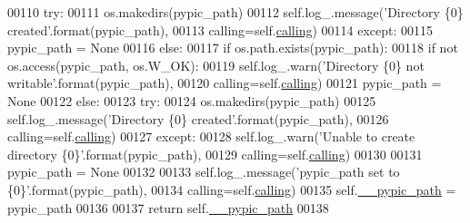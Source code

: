 \begin{DoxyCode}
00110                     \textcolor{keywordflow}{try}:
00111                         os.makedirs(pypic\_path)
00112                         self.log\_.message(\textcolor{stringliteral}{'Directory \{0\} created'}.format(pypic\_path),
00113                                           calling=self.\hyperlink{classpyneb_1_1utils_1_1_config_1_1___config_abf04542e5670abea107260ca7a6baf6d}{calling})
00114                     \textcolor{keywordflow}{except}:
00115                         pypic\_path = \textcolor{keywordtype}{None}
00116         \textcolor{keywordflow}{else}:
00117             \textcolor{keywordflow}{if} os.path.exists(pypic\_path):
00118                 \textcolor{keywordflow}{if} \textcolor{keywordflow}{not} os.access(pypic\_path, os.W\_OK):
00119                     self.log\_.warn(\textcolor{stringliteral}{'Directory \{0\} not writable'}.format(pypic\_path),
00120                                       calling=self.\hyperlink{classpyneb_1_1utils_1_1_config_1_1___config_abf04542e5670abea107260ca7a6baf6d}{calling})
00121                     pypic\_path = \textcolor{keywordtype}{None}
00122             \textcolor{keywordflow}{else}:
00123                 \textcolor{keywordflow}{try}:
00124                     os.makedirs(pypic\_path)
00125                     self.log\_.message(\textcolor{stringliteral}{'Directory \{0\} created'}.format(pypic\_path),
00126                                       calling=self.\hyperlink{classpyneb_1_1utils_1_1_config_1_1___config_abf04542e5670abea107260ca7a6baf6d}{calling})
00127                 \textcolor{keywordflow}{except}:
00128                     self.log\_.warn(\textcolor{stringliteral}{'Unable to create directory \{0\}'}.format(pypic\_path),
00129                                       calling=self.\hyperlink{classpyneb_1_1utils_1_1_config_1_1___config_abf04542e5670abea107260ca7a6baf6d}{calling})
00130                     
00131                     pypic\_path = \textcolor{keywordtype}{None}
00132             
00133         self.log\_.message(\textcolor{stringliteral}{'pypic\_path set to \{0\}'}.format(pypic\_path),
00134                                           calling=self.\hyperlink{classpyneb_1_1utils_1_1_config_1_1___config_abf04542e5670abea107260ca7a6baf6d}{calling})
00135         self.\hyperlink{classpyneb_1_1utils_1_1_config_1_1___config_a1c122165aa8885ce11f9bf86d08c40cd}{\_\_pypic\_path} = pypic\_path
00136         
00137         \textcolor{keywordflow}{return} self.\hyperlink{classpyneb_1_1utils_1_1_config_1_1___config_a1c122165aa8885ce11f9bf86d08c40cd}{\_\_pypic\_path}
00138     
\end{DoxyCode}
\hypertarget{classpyneb_1_1utils_1_1_config_1_1___config_a6d13ed9c4ac0d9fee12cc38de10fe9d2}{}
